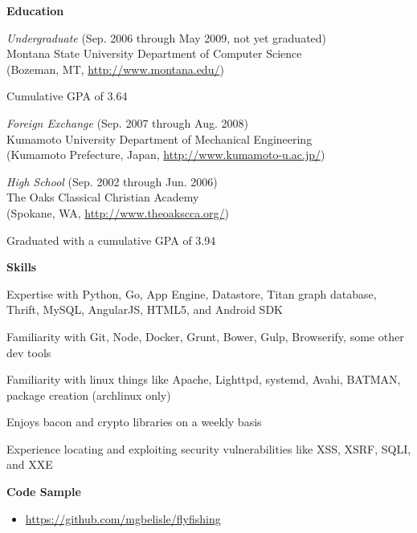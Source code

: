 \documentclass[10pt, a4paper]{article}
\begin{document}
\textbf{Education}
\begin{itemize*}
  \item \emph{Undergraduate} (Sep. 2006 through May 2009, not yet graduated)\\
    Montana State University Department of Computer Science\\
    (Bozeman, MT, \url{http://www.montana.edu/})
    \begin{itemize*}
      \item Cumulative GPA of 3.64
    \end{itemize*}
  \item \emph{Foreign Exchange} (Sep. 2007 through Aug. 2008) \\ Kumamoto University Department of Mechanical Engineering \\(Kumamoto Prefecture, Japan, \url{http://www.kumamoto-u.ac.jp/})
  \item \emph{High School} (Sep. 2002 through Jun. 2006)\\
    The Oaks Classical Christian Academy\\
    (Spokane, WA, \url{http://www.theoakscca.org/})
    \begin{itemize*}
      \item Graduated with a cumulative GPA of 3.94
    \end{itemize*}
\end{itemize*}
\textbf{Skills}
\begin{itemize*}
  \item Expertise with Python, Go, App Engine, Datastore, Titan graph database, Thrift, MySQL, AngularJS, HTML5, and Android SDK
  \item Familiarity with Git, Node, Docker, Grunt, Bower, Gulp, Browserify, some other dev tools
  \item Familiarity with linux things like Apache, Lighttpd, systemd, Avahi, BATMAN, package creation (archlinux only)
  \item Enjoys bacon and crypto libraries on a weekly basis
  \item Experience locating and exploiting security vulnerabilities like XSS, XSRF, SQLI, and XXE
\end{itemize*}
\textbf{Code Sample}
\begin{itemize}
  \item[] \url{https://github.com/mgbelisle/flyfishing}
\end{itemize}
\end{document}
